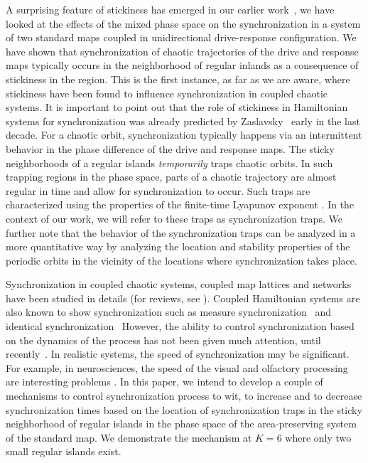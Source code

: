 \documentclass[reprint,amsmath,amssymb,aps,pre]{revtex4-1}
\begin{document}
A surprising feature of stickiness has emerged in our earlier 
work~\cite{Mahata2016}, we have looked at the effects of the mixed phase space 
on the synchronization in a system of two standard maps coupled in 
unidirectional drive-response configuration. We have shown that 
synchronization of chaotic trajectories of the drive and response maps 
typically occurs in the neighborhood of regular inlands as a consequence of 
stickiness in the region.  This is the first instance, as far as we are aware, 
where stickiness have been found to influence synchronization in coupled 
chaotic systems. It is important to point out that the role of stickiness in 
Hamiltonian systems for synchronization was already predicted by 
Zaslavsky~\cite{Zaslavsky2002b} early in the last decade.  For a chaotic 
orbit, synchronization typically happens via an intermittent behavior in the 
phase difference of the drive and response maps.   The sticky neighborhoods of 
a regular islands {\it temporarily} traps chaotic orbits. In such trapping 
regions in the phase space, parts of a  chaotic trajectory are almost regular 
in time and allow for synchronization to occur. Such traps are characterized 
using the properties of the finite-time Lyapunov exponent \cite{Szezech2005}. 
In the context of our work, we will refer to these traps as synchronization 
traps. We further note that the behavior of the synchronization traps can be 
analyzed in a more quantitative way by analyzing the location and stability 
properties of the periodic orbits in the vicinity of the locations where 
synchronization takes place.

Synchronization in coupled chaotic systems, coupled map lattices and networks 
have been studied in details (for reviews, see 
\cite{Pecora1998,Boccaletti2002, Pecora2015}). 
Coupled Hamiltonian systems are also known to show synchronization such as 
measure synchronization~\cite{Hampton1999,Wang2003,Vincent2005,Gupta2017} and 
identical synchronization~\cite{Mahata2016,Das2017} However, the ability to control synchronization based on the dynamics of the process has not been given much attention, until 
recently~\cite{Grabow2011,Wang2016}. In realistic systems, the speed of 
synchronization may be significant. For example, in
neurosciences,  the speed of the visual and olfactory processing are 
interesting problems \cite{Thorpe1996,Uchida2003}. In this paper, we intend 
to develop a couple of 
mechanisms to control synchronization process to wit,  to increase and to 
decrease synchronization times based on the location of synchronization traps 
in the sticky neighborhood of regular islands in the phase space of the 
area-preserving system of the standard map. We demonstrate the mechanism at $K 
= 6$ where only two small regular islands exist. 
\end{document}
